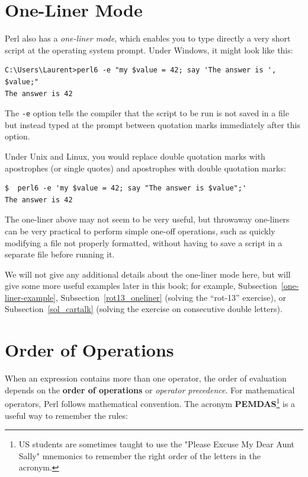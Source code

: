 \section{One-Liner Mode}

Perl also has a \emph{one-liner mode}, which enables you 
to type directly a very short script at the operating 
system prompt. Under Windows, it might look like this:
\label{one-liner mode}

\begin{verbatim}
C:\Users\Laurent>perl6 -e "my $value = 42; say 'The answer is ', $value;"
The answer is 42

\end{verbatim}

The {\tt -e} option tells the compiler that the script to 
be run is not saved in a file but instead typed at the 
prompt between quotation marks immediately after 
this option.

Under Unix and Linux, you would replace double quotation 
marks with apostrophes (or single quotes) 
and apostrophes with double quotation marks:

\begin{verbatim}
$  perl6 -e 'my $value = 42; say "The answer is $value";'
The answer is 42

\end{verbatim}

The one-liner above may not seem to be very useful, but 
throwaway one-liners can be very practical to perform 
simple one-off operations, such as quickly modifying 
a file not properly formatted, without having to save a script 
in a separate file before running it.

We will not give any additional details about the one-liner 
mode here, but will give some more useful examples 
later in this book; for example, 
Subsection~\ref{one-liner-example},
Subsection~\ref{rot13_oneliner} (solving the ``rot-13'' exercise), or
Subsection~\ref{sol_cartalk} (solving the exercise on 
consecutive double letters). 



\section{Order of Operations}

When an expression contains more than one operator, the order of
evaluation depends on the {\bf order of operations} or \emph{operator precedence}. 
For mathematical operators, Perl follows mathematical convention.
The acronym {\bf PEMDAS}\footnote{US students are sometimes taught 
to use the "Please Excuse My Dear Aunt Sally" mnemonics to remember 
the right order of the letters in the acronym.} is a useful 
way to remember the rules:

